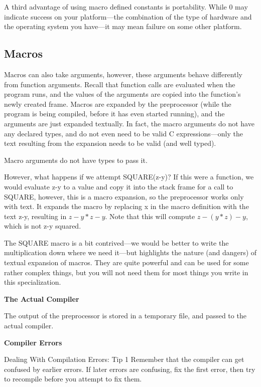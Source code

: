 \documentclass[11pt, a4paper]{article}
\begin{document}
A third advantage of using macro defined constants is portability. While 0 may indicate success on your platform—the combination of the type of hardware and the operating system you have—it may mean failure on some other platform.




\subsection{Macros}%
\label{sub:macros}


Macros can also take arguments, however, these arguments behave differently from function arguments. Recall that function calls are evaluated when the program runs, and the values of the arguments are copied into the function’s newly created frame. Macros are expanded by the preprocessor (while the program is being compiled, before it has even started running), and the arguments are just expanded textually. In fact, the macro arguments do not have any declared types, and do not even need to be valid C expressions—only the text resulting from the expansion needs to be valid (and well typed).

Macro arguments do not have types to pass it.


However, what happens if we attempt SQUARE(z-y)? If this were a function, we would evaluate z-y to a value and copy it into the stack frame for a call to SQUARE, however, this is a macro expansion, so the preprocessor works only with text. It expands the macro by replacing x in the macro definition with the text z-y, resulting in $z-y * z-y$. Note that this will compute $z- (y*z) -y$, which is not z-y squared.


The SQUARE macro is a bit contrived—we would be better to write the multiplication down where we need it—but highlights the nature (and dangers) of textual expansion of macros. They are quite powerful and can be used for some rather complex things, but you will not need them for most things you write in this specialization.


\textbf{The Actual Compiler}

The output of the preprocessor is stored in a temporary file, and passed to the actual compiler.


\textbf{Compiler Errors}

Dealing With Compilation Errors: Tip 1 Remember that the compiler can get confused by earlier errors. If later errors are confusing, fix the first error, then try to recompile before you attempt to fix them.
\end{document}

